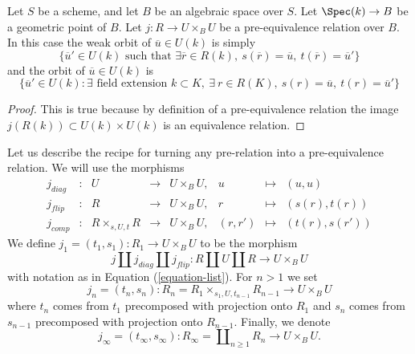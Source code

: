 \begin{lemma}
\label{lemma-weak-orbit-pre-equivalence}
Let $S$ be a scheme, and let $B$ be an algebraic space over $S$.
Let $\Spec(k) \to B$ be a geometric point of $B$.
Let $j : R \to U \times_B U$ be a pre-equivalence relation over $B$.
In this case the weak orbit of $\overline{u} \in U(k)$ is simply
$$
\{
\overline{u}' \in U(k)
\text{ such that }
\exists \overline{r} \in R(k),
\ s(\overline{r}) = \overline{u},
\ t(\overline{r}) = \overline{u}'
\}
$$
and the orbit of $\overline{u} \in U(k)$ is
$$
\{
\overline{u}' \in U(k) :
\exists\text{ field extension }k \subset K, \ \exists\ r \in R(K),
\ s(r) = \overline{u}, \ t(r) = \overline{u}'\}
$$
\end{lemma}

\begin{proof}
This is true because by definition of a pre-equivalence relation the image
$j(R(k)) \subset U(k) \times U(k)$ is an equivalence relation.
\end{proof}

\noindent
Let us describe the recipe for turning any pre-relation into a
pre-equivalence relation. We will use the morphisms
\begin{equation}
\label{equation-list}
\begin{matrix}
j_{diag} &
: &
U &
\longrightarrow &
U \times_B U, &
u &
\longmapsto &
(u, u) \\
j_{flip} &
: &
R &
\longrightarrow &
U \times_B U, &
r &
\longmapsto &
(s(r), t(r)) \\
j_{comp} &
: &
R \times_{s, U, t} R &
\longrightarrow &
U \times_B U, &
(r, r') &
\longmapsto &
(t(r), s(r'))
\end{matrix}
\end{equation}
We define $j_1 = (t_1, s_1) : R_1 \to U \times_B U$ to be the morphism
$$
j \amalg j_{diag} \amalg j_{flip} :
R \amalg U \amalg R
\longrightarrow
U \times_B U
$$
with notation as in
Equation (\ref{equation-list}).
For $n > 1$ we set
$$
j_n = (t_n, s_n) :
R_n = R_1 \times_{s_1, U, t_{n - 1}} R_{n - 1} \longrightarrow U \times_B U
$$
where $t_n$ comes from $t_1$ precomposed with projection onto $R_1$ and
$s_n$ comes from $s_{n - 1}$ precomposed with projection onto $R_{n - 1}$.
Finally, we denote
$$
j_\infty = (t_\infty, s_\infty) :
R_\infty = \coprod\nolimits_{n \geq 1} R_n
\longrightarrow
U \times_B U.
$$

